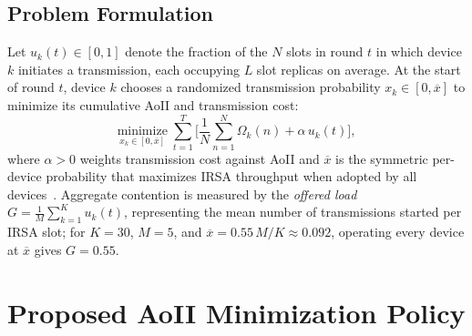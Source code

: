 \documentclass[conference]{IEEEtran}
\begin{document}
  \figIrsa

\subsection{Problem Formulation}
\label{sec:problem}
  Let $u_k(t) \in [0,1]$ denote the fraction of the $N$ slots in round $t$ in which device $k$ initiates a transmission, each occupying $L$ slot replicas on average.
  At the start of round $t$, device $k$ chooses a randomized transmission probability $x_k \in [0, \overline{x}]$ to minimize its cumulative AoII and transmission cost:
  \begin{equation}
    \underset{x_k \in [0, \overline{x}]}{\text{minimize}} \;
    \sum_{t=1}^{T} \Big[ \frac{1}{N}\sum_{n=1}^{N} \Omega_k(n) + \alpha\, u_k(t) \Big],
    \label{eq:problem}
  \end{equation}
  where $\alpha > 0$ weights transmission cost against AoII and $\overline{x}$ is the symmetric per-device probability that maximizes IRSA throughput when adopted by all devices~\cite{munari2021modern}.
  Aggregate contention is measured by the \emph{offered load} $G = \frac{1}{M}\sum_{k=1}^K u_k(t)$, representing the mean number of transmissions started per IRSA slot; for $K = 30$, $M = 5$, and $\overline{x} = 0.55\,M/K \approx 0.092$, operating every device at $\overline{x}$ gives $G = 0.55$.

\section{Proposed AoII Minimization Policy}
\label{sec:propose}
\end{document}

